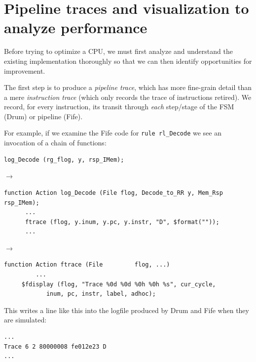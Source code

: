 
\section{Pipeline traces and visualization to analyze performance}

Before trying to optimize a CPU, we must first analyze and understand
the existing implementation thoroughly so that we can then identify
opportunities for improvement.


The first step is to produce a \emph{pipeline trace}, which has more
fine-grain detail than a mere \emph{instruction trace} (which only
records the trace of instructions retired).  We record, for every
instruction, its transit through \emph{each} step/stage of the FSM
(Drum) or pipeline (Fife).

For example, if we examine the Fife code for \verb|rule rl_Decode| we
see an invocation of a chain of functions:

{\small
\begin{Verbatim}[frame=single, label=src\_Fife/S2\_Decode.bsv]
      log_Decode (rg_flog, y, rsp_IMem);
\end{Verbatim}
}

$\longrightarrow$

{\small
\begin{Verbatim}[frame=single, label=src\_Common/Fn\_Decode.bsv]
   function Action log_Decode (File flog, Decode_to_RR y, Mem_Rsp rsp_IMem);
      ...
      ftrace (flog, y.inum, y.pc, y.instr, "D", $format(""));
      ...
\end{Verbatim}
}

$\longrightarrow$

{\small
\begin{Verbatim}[frame=single, label=src\_Common/Utils.bsv]
function Action ftrace (File         flog, ...)
         ...
	 $fdisplay (flog, "Trace %0d %0d %0h %0h %s", cur_cycle,
		    inum, pc, instr, label, adhoc);
\end{Verbatim}
}

This writes a line like this into the logfile produced by Drum and
Fife when they are simulated:

{\small
\begin{Verbatim}[frame=single, label=log.txt]
...
Trace 6 2 80000008 fe012e23 D
...
\end{Verbatim}
}

